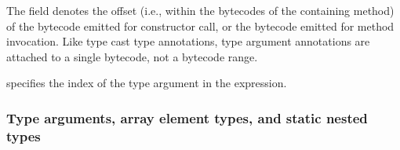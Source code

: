 \documentclass[10pt]{article}
\begin{document}
The  field denotes the offset (i.e., within the bytecodes
of the containing method) of the  bytecode emitted for
constructor call, or the
 bytecode emitted for
method invocation.  Like type cast type annotations, type argument
annotations are attached to a single bytecode, not a bytecode range.

 specifies the index of the type argument in the
expression.



\subsubsection{Type arguments, array element types, and static nested types\label{class-file:ext:ri:typearg}}
\end{document}
